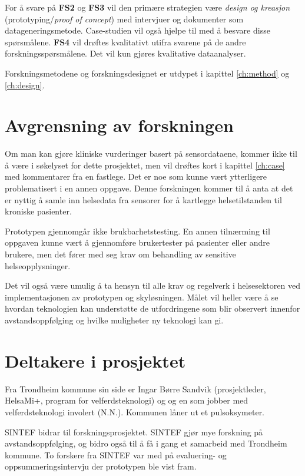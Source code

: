 For å svare på \textbf{FS2} og \textbf{FS3} vil den primære strategien være \textit{design og kreasjon} (prototyping/\textit{proof of concept})
med intervjuer og dokumenter som datageneringsmetode. Case-studien vil også hjelpe til med å besvare disse spørsmålene. \textbf{FS4} vil drøftes kvalitativt 
utifra svarene på de andre forskningsspørsmålene. Det vil kun gjøres kvalitative dataanalyser.

Forskningsmetodene og forskningsdesignet er utdypet i kapittel \ref{ch:method} og \ref{ch:design}.

\section{Avgrensning av forskningen}
Om man kan gjøre kliniske vurderinger basert på sensordataene, kommer ikke til å være i søkelyset for dette prosjektet,
men vil drøftes kort i kapittel \ref{ch:case} med kommentarer fra en fastlege. Det er noe som kunne vært ytterligere problematisert i en annen oppgave.
Denne forskningen kommer til å anta at det er nyttig å samle inn helsedata fra sensorer for å kartlegge helsetilstanden til kroniske pasienter.

Prototypen gjennomgår ikke brukbarhetstesting. En annen tilnærming til oppgaven kunne vært å gjennomføre brukertester på pasienter eller andre brukere, men det
fører med seg krav om behandling av sensitive helseopplysninger. %

Det vil også være umulig å ta hensyn til alle krav og regelverk i helsesektoren ved implementasjonen av prototypen og skyløsningen. Målet vil heller
være å se hvordan teknologien kan understøtte de utfordringene som blir observert innenfor avstandsoppfølging og hvilke muligheter ny teknologi kan gi.

\section{Deltakere i prosjektet}
Fra Trondheim kommune sin side er Ingar Børre Sandvik (prosjektleder, HelsaMi+, program for velferdsteknologi) og
og en som jobber med velferdsteknologi involert (N.N.). Kommunen låner ut et pulsoksymeter.

SINTEF bidrar til forskningsprosjektet. SINTEF gjør mye forskning på
avstandsoppfølging, og bidro også til å få i gang et samarbeid med Trondheim kommune.
To forskere fra SINTEF var med på evaluering- og oppsummeringsintervju der prototypen
ble vist fram.

